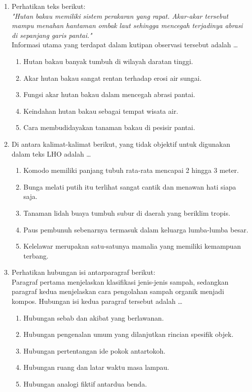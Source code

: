 \documentclass[12pt,a4paper]{article}
\begin{document}
\begin{enumerate}[leftmargin=*]
\item Perhatikan teks berikut:\\
\textit{"Hutan bakau memiliki sistem perakaran yang rapat. Akar-akar tersebut mampu menahan hantaman ombak laut sehingga mencegah terjadinya abrasi di sepanjang garis pantai."}\\
Informasi utama yang terdapat dalam kutipan observasi tersebut adalah \dots
    \begin{enumerate}[label=\alph*.]
        \item Hutan bakau banyak tumbuh di wilayah daratan tinggi.
        \item Akar hutan bakau sangat rentan terhadap erosi air sungai.
        \item Fungsi akar hutan bakau dalam mencegah abrasi pantai.
        \item Keindahan hutan bakau sebagai tempat wisata air.
        \item Cara membudidayakan tanaman bakau di pesisir pantai.
    \end{enumerate}

\item Di antara kalimat-kalimat berikut, yang tidak objektif untuk digunakan dalam teks LHO adalah \dots
    \begin{enumerate}[label=\alph*.]
        \item Komodo memiliki panjang tubuh rata-rata mencapai 2 hingga 3 meter.
        \item Bunga melati putih itu terlihat sangat cantik dan menawan hati siapa saja.
        \item Tanaman lidah buaya tumbuh subur di daerah yang beriklim tropis.
        \item Paus pembunuh sebenarnya termasuk dalam keluarga lumba-lumba besar.
        \item Kelelawar merupakan satu-satunya mamalia yang memiliki kemampuan terbang.
    \end{enumerate}

\item Perhatikan hubungan isi antarparagraf berikut:\\
Paragraf pertama menjelaskan klasifikasi jenis-jenis sampah, sedangkan paragraf kedua menjelaskan cara pengolahan sampah organik menjadi kompos. Hubungan isi kedua paragraf tersebut adalah \dots
    \begin{enumerate}[label=\alph*.]
        \item Hubungan sebab dan akibat yang berlawanan.
        \item Hubungan pengenalan umum yang dilanjutkan rincian spesifik objek.
        \item Hubungan pertentangan ide pokok antartokoh.
        \item Hubungan ruang dan latar waktu masa lampau.
        \item Hubungan analogi fiktif antardua benda.
    \end{enumerate}


\end{enumerate}
\end{document}
